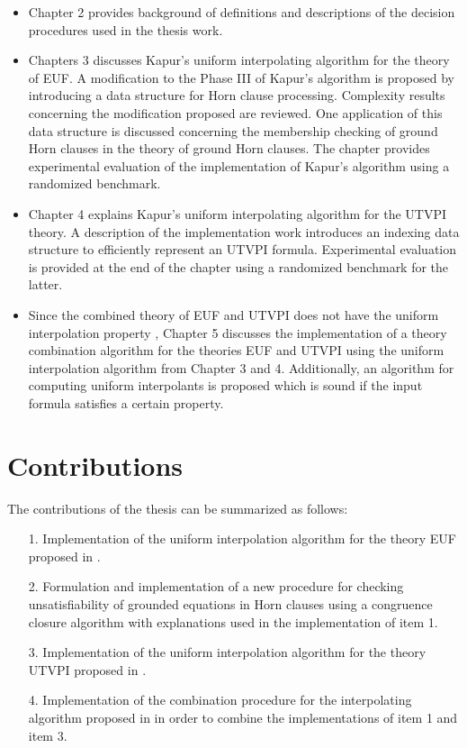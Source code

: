 \begin{itemize}
  \item Chapter 2 provides background 
    of definitions and descriptions of the
    decision procedures 
    used in the thesis work.
  \item Chapters 3 discusses Kapur's uniform 
    interpolating algorithm for the theory of EUF.
    A modification to the Phase III of 
    Kapur's algorithm is proposed by introducing a 
    data structure for Horn clause processing. 
    Complexity results concerning the modification 
    proposed are reviewed. 
    One application of this data structure
    is discussed concerning the membership 
    checking of ground 
    Horn clauses in the theory of ground Horn clauses.
    The chapter provides experimental evaluation
    of the implementation of Kapur's algorithm 
    using a randomized benchmark.
  \item Chapter 4 explains Kapur's uniform interpolating
    algorithm for the UTVPI theory. A description 
    of the implementation work introduces an indexing
    data structure to efficiently represent an UTVPI
    formula. Experimental evaluation is provided at 
    the end of the chapter using a randomized 
    benchmark for the latter. 
  \item Since the combined theory of EUF and UTVPI
    does not have the uniform interpolation property 
    \cite{10.1007/978-3-030-51074-9_11},
    Chapter 5 discusses the implementation of
    a theory combination algorithm for the theories
    EUF and UTVPI using the uniform 
    interpolation algorithm from Chapter 3 and 4. 
    Additionally, an algorithm for computing 
    uniform interpolants
    is proposed which is sound if the input 
    formula satisfies a certain property.

\end{itemize} 

\section{Contributions}

The contributions of the thesis can be summarized as follows:

\begin{itemize}
  \item[1.] Implementation of the uniform 
    interpolation algorithm for the theory EUF 
    proposed in \cite{KAPUR2017}.
  \item[2.] Formulation and implementation of a new 
    procedure for checking unsatisfiability of 
    grounded equations in 
    Horn clauses using a congruence closure 
    algorithm with explanations
    used in the implementation of item 1.
  \item[3.] Implementation of the uniform 
    interpolation algorithm for the theory UTVPI
    proposed in \cite{KAPUR2017}.
  \item[4.] Implementation of the combination 
    procedure for the interpolating
    algorithm proposed in 
    \cite{10.1007/11532231_26} in order to 
    combine the implementations of item 1 and item 3.
\end{itemize}

